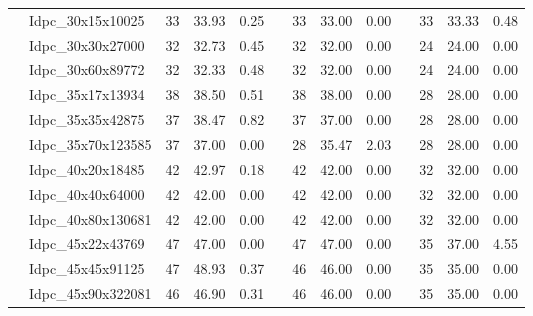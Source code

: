 \begin{table}[htbp]
{\begin{tabular}{clccccccccccc}
			& Idpc\_30x15x10025 & 33  & 33.93  & 0.25 & & 33 & 33.00 & 0.00 & & 33 & \textcolor[rgb]{ 1,  0,  0}{33.33} & 0.48 \\
			& Idpc\_30x30x27000 & 32  & 32.73  & 0.45 & & 32 & 32.00 & 0.00 & & 24 & \textcolor[rgb]{ 1,  0,  0}{24.00} & 0.00 \\
			& Idpc\_30x60x89772 & 32  & 32.33  & 0.48 & & 32 & 32.00 & 0.00 & & 24 & \textcolor[rgb]{ 1,  0,  0}{24.00} & 0.00 \\
			& Idpc\_35x17x13934 & 38  & 38.50  & 0.51 & & 38 & 38.00 & 0.00 & & 28 & \textcolor[rgb]{ 1,  0,  0}{28.00} & 0.00 \\
			& Idpc\_35x35x42875 & 37  & 38.47  & 0.82 & & 37 & 37.00 & 0.00 & & 28 & \textcolor[rgb]{ 1,  0,  0}{28.00} & 0.00 \\
			& Idpc\_35x70x123585 & 37  & 37.00  & 0.00 & & 28 & 35.47 & 2.03 & & 28 & \textcolor[rgb]{ 1,  0,  0}{28.00} & 0.00 \\
			& Idpc\_40x20x18485 & 42  & 42.97  & 0.18 & & 42 & 42.00 & 0.00 & & 32 & \textcolor[rgb]{ 1,  0,  0}{32.00} & 0.00 \\
			& Idpc\_40x40x64000 & 42  & 42.00  & 0.00 & & 42 & 42.00 & 0.00 & & 32 & \textcolor[rgb]{ 1,  0,  0}{32.00} & 0.00 \\
			& Idpc\_40x80x130681 & 42  & 42.00  & 0.00 & & 42 & 42.00 & 0.00 & & 32 & \textcolor[rgb]{ 1,  0,  0}{32.00} & 0.00 \\
			& Idpc\_45x22x43769 & 47  & 47.00  & 0.00 & & 47 & 47.00 & 0.00 & & 35 & \textcolor[rgb]{ 1,  0,  0}{37.00} & 4.55 \\
			& Idpc\_45x45x91125 & 47  & 48.93  & 0.37 & & 46 & 46.00 & 0.00 & & 35 & \textcolor[rgb]{ 1,  0,  0}{35.00} & 0.00 \\
			& Idpc\_45x90x322081 & 46  & 46.90  & 0.31 & & 46 & 46.00 & 0.00 & & 35 & \textcolor[rgb]{ 1,  0,  0}{35.00} & 0.00 \\
			\bottomrule
		\end{tabular}
	}
	\label{tab:type_1}%
\end{table}

